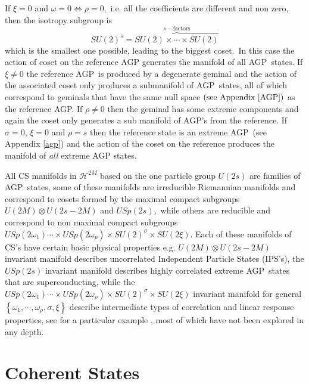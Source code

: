 \documentclass[aps,preprint]{revtex4}%
\begin{document}
If $\xi=0$ and $\omega=0\Leftrightarrow\rho=0,$ i.e. all the coefficients are
different and non zero, then the isotropy subgroup is
\begin{equation}
SU\left(  2\right)  ^{s}=\overset{s-\text{factors}}{\overbrace{SU\left(
2\right)  \times\cdots\times SU\left(  2\right)  }}%
\end{equation}
which is the smallest one possible, leading to the biggest coset.\ In this
case the action of coset on the reference AGP generates the manifold of all
AGP\ states. If $\xi\neq0$ the reference AGP\ is produced by a degenerate
geminal and the action of the associated coset only produces a submanifold of
AGP\ states, all of which correspond to geminals that have the same null space
$\left(  \text{see Appendix \ref{AGP}}\right)  $ as the reference AGP. If
$\rho\neq0$ then the geminal has some extreme components and again the coset
only generates a sub manifold of AGP's from the reference. If $\sigma=0$,
$\xi=0$ and $\rho=s$ then the reference state is an extreme AGP\ (see Appendix
\ref{agp}) and the action of the coset on the reference produces the manifold
of \emph{all }extreme AGP states.

All CS manifolds in $\mathcal{H}^{2M}$ based on the one particle group
$U\left(  2s\right)  $ are families of AGP\ states, some of these manifolds
are irreducible Riemannian manifolds and correspond to cosets formed by the
maximal compact subgroups $U\left(  2M\right)  \otimes U\left(  2s-2M\right)
$ and $USp\left(  2s\right)  ,$ while others are reducible and correspond to
non maximal compact subgroups $USp\left(  2\omega_{1}\right)  \cdots\times
USp\left(  2\omega_{p}\right)  \times SU\left(  2\right)  ^{\sigma}\times
SU\left(  2\xi\right)  $. Each of these manifolds of CS's have certain basic
physical properties e.g. $U\left(  2M\right)  \otimes U\left(  2s-2M\right)  $
invariant manifold describes uncorrelated Independent Particle States (IPS's),
the $USp\left(  2s\right)  $ invariant manifold describes highly correlated
extreme AGP\ states that are superconducting, while the $USp\left(
2\omega_{1}\right)  \cdots\times USp\left(  2\omega_{\rho}\right)  \times
SU\left(  2\right)  ^{\sigma}\times SU\left(  2\xi\right)  $ invariant
manifold for general $\left\{  \omega_{1},\cdots,\omega_{\rho},\sigma
,\xi\right\}  $ describe intermediate types of correlation and linear response
properties, see for a particular example \cite{Goscinski82a}, most of which
have not been explored in any depth.

\section{Coherent States\label{cohstate}}
\end{document}
